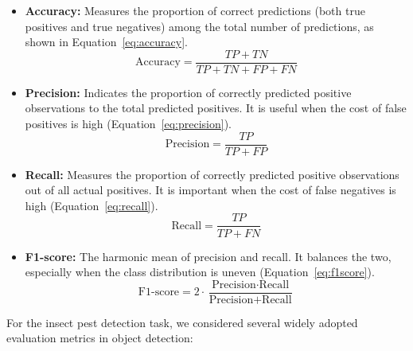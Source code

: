\begin{itemize}
    \item \textbf{Accuracy:} Measures the proportion of correct predictions (both true positives and true negatives) among the total number of predictions, as shown in Equation~\ref{eq:accuracy}.
    \begin{equation}
        \text{Accuracy} = \frac{TP + TN}{TP + TN + FP + FN}
        \label{eq:accuracy}
    \end{equation}

    \item \textbf{Precision:} Indicates the proportion of correctly predicted positive observations to the total predicted positives. It is useful when the cost of false positives is high (Equation~\ref{eq:precision}).
    \begin{equation}
        \text{Precision} = \frac{TP}{TP + FP}
        \label{eq:precision}
    \end{equation}

    \item \textbf{Recall:} Measures the proportion of correctly predicted positive observations out of all actual positives. It is important when the cost of false negatives is high (Equation~\ref{eq:recall}).
    \begin{equation}
        \text{Recall} = \frac{TP}{TP + FN}
        \label{eq:recall}
    \end{equation}

    \item \textbf{F1-score:} The harmonic mean of precision and recall. It balances the two, especially when the class distribution is uneven (Equation~\ref{eq:f1score}).
    \begin{equation}
        \text{F1-score} = 2 \cdot \frac{\text{Precision} \cdot \text{Recall}}{\text{Precision} + \text{Recall}}
        \label{eq:f1score}
    \end{equation}
\end{itemize}

For the insect pest detection task, we considered several widely adopted evaluation metrics in object detection:

